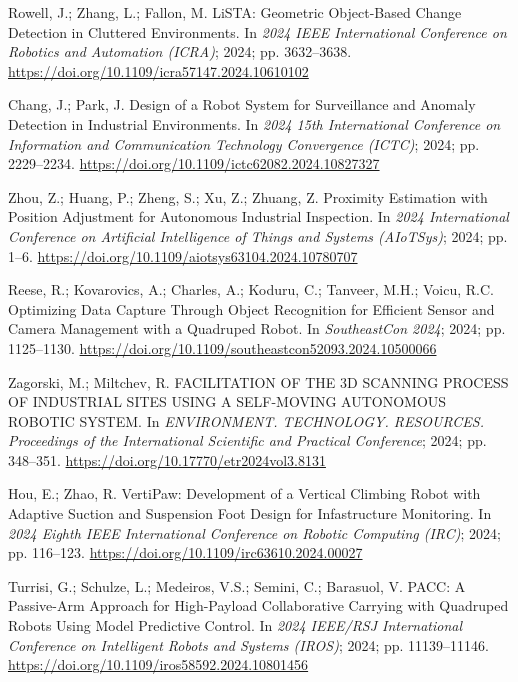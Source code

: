 Rowell, J.; Zhang, L.; Fallon, M. LiSTA: Geometric Object-Based Change Detection in Cluttered Environments. In \emph{2024 IEEE International Conference on Robotics and Automation (ICRA)}; 2024; pp. 3632--3638. \url{https://doi.org/10.1109/icra57147.2024.10610102}

Chang, J.; Park, J. Design of a Robot System for Surveillance and Anomaly Detection in Industrial Environments. In \emph{2024 15th International Conference on Information and Communication Technology Convergence (ICTC)}; 2024; pp. 2229--2234. \url{https://doi.org/10.1109/ictc62082.2024.10827327}

Zhou, Z.; Huang, P.; Zheng, S.; Xu, Z.; Zhuang, Z. Proximity Estimation with Position Adjustment for Autonomous Industrial Inspection. In \emph{2024 International Conference on Artificial Intelligence of Things and Systems (AIoTSys)}; 2024; pp. 1--6. \url{https://doi.org/10.1109/aiotsys63104.2024.10780707}

Reese, R.; Kovarovics, A.; Charles, A.; Koduru, C.; Tanveer, M.H.; Voicu, R.C. Optimizing Data Capture Through Object Recognition for Efficient Sensor and Camera Management with a Quadruped Robot. In \emph{SoutheastCon 2024}; 2024; pp. 1125--1130. \url{https://doi.org/10.1109/southeastcon52093.2024.10500066}

Zagorski, M.; Miltchev, R. FACILITATION OF THE 3D SCANNING PROCESS OF INDUSTRIAL SITES USING A SELF-MOVING AUTONOMOUS ROBOTIC SYSTEM. In \emph{ENVIRONMENT. TECHNOLOGY. RESOURCES. Proceedings of the International Scientific and Practical Conference}; 2024; pp. 348--351. \url{https://doi.org/10.17770/etr2024vol3.8131}

Hou, E.; Zhao, R. VertiPaw: Development of a Vertical Climbing Robot with Adaptive Suction and Suspension Foot Design for Infastructure Monitoring. In \emph{2024 Eighth IEEE International Conference on Robotic Computing (IRC)}; 2024; pp. 116--123. \url{https://doi.org/10.1109/irc63610.2024.00027}

Turrisi, G.; Schulze, L.; Medeiros, V.S.; Semini, C.; Barasuol, V. PACC: A Passive-Arm Approach for High-Payload Collaborative Carrying with Quadruped Robots Using Model Predictive Control. In \emph{2024 IEEE/RSJ International Conference on Intelligent Robots and Systems (IROS)}; 2024; pp. 11139--11146. \url{https://doi.org/10.1109/iros58592.2024.10801456}

